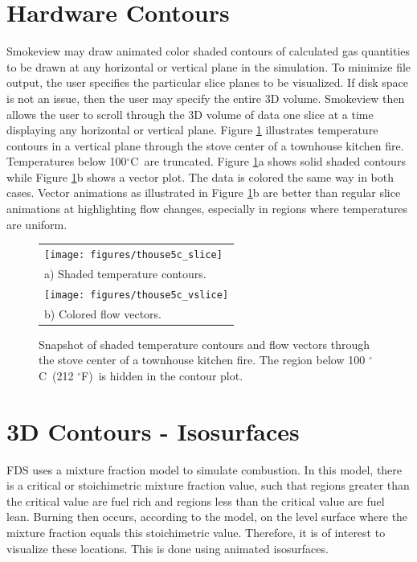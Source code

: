 \documentclass[11pt,twoside]{book}
\newcommand{\degF}{$^\circ$F}
\newcommand{\degC}{$^\circ$C}
\newcommand{\figoptions}{htp}
\begin{document}
\section{Hardware Contours}
Smokeview may draw animated color shaded contours of calculated gas
quantities to be drawn at any horizontal or vertical plane in the
simulation. To minimize file output, the user specifies the
particular slice planes to be visualized.  If disk space is not an
issue, then the user may specify the entire 3D volume. Smokeview
then allows the user to scroll through the 3D volume of data one
slice at a time displaying any horizontal or vertical plane.
Figure \ref{figslice} illustrates temperature contours in a
vertical plane through the stove center of a townhouse kitchen fire.
Temperatures below 100\degC\ are truncated. Figure \ref{figslice}a
shows solid shaded contours while Figure \ref{figslice}b shows a
vector plot. The data is colored the same way in both cases.
Vector animations as illustrated in Figure \ref{figslice}b are
better than regular slice animations at highlighting flow changes,
especially in regions where temperatures are uniform.
\begin{figure}[\figoptions]
\begin{center}
\begin{tabular}{l}
 \texttt{[image: figures/thouse5c\_slice]}\\
a) Shaded temperature contours.\\
 \texttt{[image: figures/thouse5c\_vslice]}\\
b) Colored flow vectors.\\
\end{tabular}
\end{center}
\caption{Snapshot of shaded temperature contours and flow vectors
through the stove center of a townhouse kitchen fire.
The region below 100 \degC\ (212 \degF)\ is hidden
in the contour plot.
  }
\label{figslice}%
\end{figure}

\section{3D Contours - Isosurfaces}
FDS uses a mixture fraction model to simulate
combustion. In this model, there is a critical or stoichimetric
mixture fraction value, such that regions greater than the
critical value are fuel rich and regions less than the critical
value are fuel lean. Burning then occurs, according to the model,
on the level surface where the mixture fraction equals this
stoichimetric value. Therefore, it is of interest to visualize
these locations. This is done using animated isosurfaces.
\end{document}
